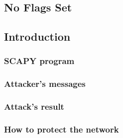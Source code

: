 \subsection{No Flags Set}
\subsection{Introduction}


\subsubsection{SCAPY program}


\subsubsection{Attacker's messages}

\subsubsection{Attack's result}


\subsubsection{How to protect the network}
